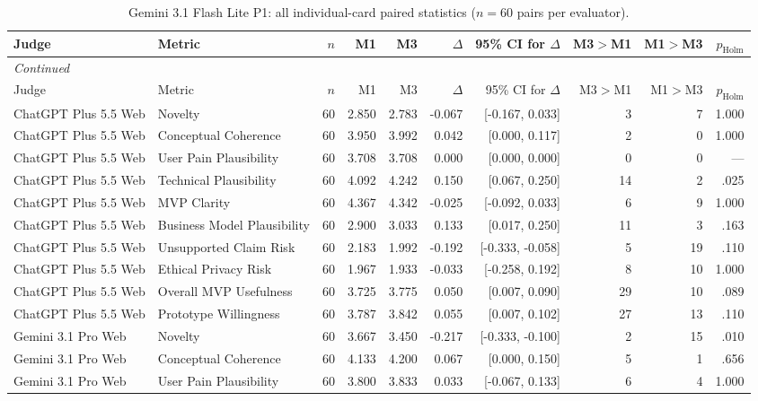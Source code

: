 \documentclass[10pt]{article}
\begin{document}
\begin{landscape}
\small
\setlength{\LTcapwidth}{\textwidth}
\begin{longtable}{llrrrrrrrr}
\caption{Gemini 3.1 Flash Lite P1: all individual-card paired statistics ($n=60$ pairs per evaluator).}\label{tab:s1-ind31}\\
\toprule
Judge & Metric & $n$ & M1 & M3 & $\Delta$ & 95\% CI for $\Delta$ & M3$>$M1 & M1$>$M3 & $p_{\mathrm{Holm}}$ \\
\midrule\endfirsthead
\multicolumn{10}{l}{\small\itshape Continued}\\
\toprule Judge & Metric & $n$ & M1 & M3 & $\Delta$ & 95\% CI for $\Delta$ & M3$>$M1 & M1$>$M3 & $p_{\mathrm{Holm}}$ \\ \midrule\endhead
\bottomrule\endfoot
ChatGPT Plus 5.5 Web & Novelty & 60 & 2.850 & 2.783 & -0.067 & [-0.167, 0.033] & 3 & 7 & 1.000 \\
ChatGPT Plus 5.5 Web & Conceptual Coherence & 60 & 3.950 & 3.992 & 0.042 & [0.000, 0.117] & 2 & 0 & 1.000 \\
ChatGPT Plus 5.5 Web & User Pain Plausibility & 60 & 3.708 & 3.708 & 0.000 & [0.000, 0.000] & 0 & 0 & — \\
ChatGPT Plus 5.5 Web & Technical Plausibility & 60 & 4.092 & 4.242 & 0.150 & [0.067, 0.250] & 14 & 2 & .025 \\
ChatGPT Plus 5.5 Web & MVP Clarity & 60 & 4.367 & 4.342 & -0.025 & [-0.092, 0.033] & 6 & 9 & 1.000 \\
ChatGPT Plus 5.5 Web & Business Model Plausibility & 60 & 2.900 & 3.033 & 0.133 & [0.017, 0.250] & 11 & 3 & .163 \\
ChatGPT Plus 5.5 Web & Unsupported Claim Risk & 60 & 2.183 & 1.992 & -0.192 & [-0.333, -0.058] & 5 & 19 & .110 \\
ChatGPT Plus 5.5 Web & Ethical Privacy Risk & 60 & 1.967 & 1.933 & -0.033 & [-0.258, 0.192] & 8 & 10 & 1.000 \\
ChatGPT Plus 5.5 Web & Overall MVP Usefulness & 60 & 3.725 & 3.775 & 0.050 & [0.007, 0.090] & 29 & 10 & .089 \\
ChatGPT Plus 5.5 Web & Prototype Willingness & 60 & 3.787 & 3.842 & 0.055 & [0.007, 0.102] & 27 & 13 & .110 \\
Gemini 3.1 Pro Web & Novelty & 60 & 3.667 & 3.450 & -0.217 & [-0.333, -0.100] & 2 & 15 & .010 \\
Gemini 3.1 Pro Web & Conceptual Coherence & 60 & 4.133 & 4.200 & 0.067 & [0.000, 0.150] & 5 & 1 & .656 \\
Gemini 3.1 Pro Web & User Pain Plausibility & 60 & 3.800 & 3.833 & 0.033 & [-0.067, 0.133] & 6 & 4 & 1.000 \\

\end{longtable}
\end{landscape}
\end{document}
